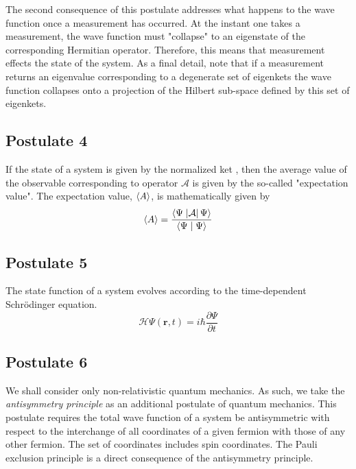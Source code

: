 The second consequence of this postulate addresses what happens to the wave function once a
measurement has occurred. At the instant one takes a measurement, the wave function must "collapse" to an eigenstate of the corresponding Hermitian operator. Therefore, this means that measurement effects the state of the system. As a final detail, note that if a measurement returns an eigenvalue corresponding to a degenerate set of eigenkets the wave function collapses onto a projection of the Hilbert sub-space defined by this set of eigenkets.

%
\subsection{Postulate 4}
If the state of a system is given by the normalized ket \ket{\Psi}, then the average value of the observable corresponding to operator $\mathcal{A}$ is given by the so-called "expectation value". The expectation value, $\expect{A}$, is mathematically given by
%
\begin{equation}
\displaystyle
  \expect{A} = \frac{
    \braketop{\Psi}{\mathcal{A}}{\Psi}}
    {\braket{\Psi}{\Psi}
  }
\end{equation}

%
\subsection{Postulate 5}
The state function of a system evolves according to the time-dependent
Schr\"{o}dinger equation.
%
\begin{equation}
\displaystyle
  \mathcal{H}\Psi\left(\mathbf{r},t\right) =
    i\hbar\frac{\partial{\Psi}}{\partial{t}}
\end{equation}

%
\subsection{Postulate 6}
We shall consider only non-relativistic quantum mechanics. As such, we take
the \emph{antisymmetry principle} as an additional postulate of quantum
mechanics. This postulate requires the total wave
function of a system be antisymmetric with respect to the interchange
of all coordinates of a given fermion with those of any other fermion. The set
of coordinates includes spin coordinates. The Pauli exclusion principle
is a direct consequence of the antisymmetry principle.

%
